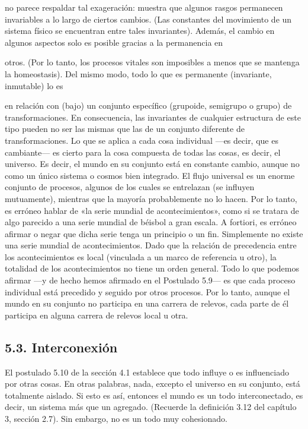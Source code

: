 \begin{justifying}
\begin{justifying}
   \bigskip
   no parece respaldar tal exageración: muestra que algunos rasgos
permanecen invariables a lo largo de ciertos cambios. (Las constantes del
movimiento de un sistema físico se encuentran entre tales invariantes). Además,
el cambio en algunos aspectos solo es posible gracias a la permanencia en

otros. (Por lo tanto, los procesos vitales son imposibles a menos que se mantenga la homeostasis).
 Del mismo modo, todo lo que es permanente (invariante, inmutable) lo es

en relación con (bajo) un conjunto específico (grupoide, semigrupo o grupo) de
transformaciones. En consecuencia, las invariantes de cualquier estructura de este tipo
pueden no ser las mismas que las de un conjunto diferente de transformaciones.
Lo que se aplica a cada cosa individual —es decir, que es cambiante— es
cierto para la cosa compuesta de todas las cosas, es decir, el universo. Es decir, el
mundo en su conjunto está en constante cambio, aunque no como un único sistema
o cosmos bien integrado. El flujo universal es un enorme conjunto de procesos, algunos de los
cuales se entrelazan (se influyen mutuamente), mientras que la mayoría probablemente no lo hacen.
Por lo tanto, es erróneo hablar de «la serie mundial de acontecimientos», como si
se tratara de algo parecido a una serie mundial de béisbol a gran escala. A fortiori, es
erróneo afirmar o negar que dicha serie tenga un principio o un fin.
Simplemente no existe una serie mundial de acontecimientos. Dado que la relación de precedencia
entre los acontecimientos es local (vinculada a un marco de referencia u otro), la
totalidad de los acontecimientos no tiene un orden general. Todo lo que podemos afirmar —y de hecho hemos
afirmado en el Postulado 5.9— es que cada proceso individual está precedido
y seguido por otros procesos. Por lo tanto, aunque el mundo en su conjunto
no participa en una carrera de relevos, cada parte de él participa en alguna
carrera de relevos local u otra.
    \noindent
    \bigskip
    \subsection{5.3. Interconexión}
    El postulado 5.10 de la sección 4.1 establece que todo influye o es
influenciado por otras cosas. En otras palabras, nada, excepto
el universo en su conjunto, está totalmente aislado. Si esto es así, entonces el mundo es
un todo interconectado, es decir, un sistema más que un agregado. (Recuerde
la definición 3.12 del capítulo 3, sección 2.7). Sin embargo, no es un todo muy cohesionado.


\end{justifying}
\end{justifying}
